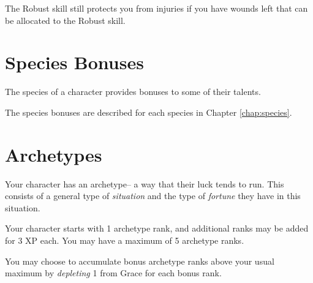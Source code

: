 The Robust skill still protects you from injuries if you have wounds left that can be allocated to the Robust skill.

\section{Species Bonuses}

The species of a character provides bonuses to some of their talents.

The species bonuses are described for each species in Chapter \ref{chap:species}.

\section{Archetypes}

Your character has an archetype-- a way that their luck tends to run. This consists of a general type of \emph{situation} and the type of \emph{fortune} they have in this situation.

Your character starts with 1 archetype rank, and additional ranks may be added for 3 XP each. You may have a maximum of 5 archetype ranks.

You may choose to accumulate bonus archetype ranks above your usual maximum by \emph{depleting} 1 from Grace for each bonus rank.


